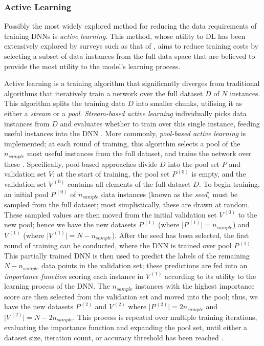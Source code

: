 \documentclass[a4paper, 11pt]{report}
\begin{document}
    \subsubsection{Active Learning}
    \label{section: active-learning}

    Possibly the most widely explored method for reducing the data requirements of training DNNs is \emph{active learning}. This method, whose utility to DL has been extensively explored by surveys such as that of \citet{ren-2021}, aims to reduce training costs by selecting a subset of data instances from the full data space that are believed to provide the most utility to the model's learning process. 

    Active learning is a training algorithm that significantly diverges from traditional algorithms that iteratively train a network over the full dataset $D$ of $N$ instances. This algorithm splits the training data $D$ into smaller chunks, utilising it as either a \emph{stream} or a \emph{pool}. \emph{Stream-based active learning} individually picks data instances from $D$ and evaluates whether to train over this single instance, feeding useful instances into the DNN \citep{ren-2021}. More commonly, \emph{pool-based active learning} is implemented; at each round of training, this algorithm selects a pool of the $n_{sample}$ most useful instances from the full dataset, and trains the network over these \citep{ren-2021}. Specifically, pool-based approaches divide $D$ into the pool set $P$ and validation set $V$; at the start of training, the pool set $P^{\,(0)}$ is empty, and the validation set $V^{\,(0)}$ contains all elements of the full dataset $D$. To begin training, an initial pool $P^{\,(0)}$ of $n_{sample}$ data instances (known as the \emph{seed}) must be sampled from the full dataset; most simplistically, these are drawn at random. These sampled values are then moved from the initial validation set $V^{\,(0)}$ to the new pool; hence we have the new datasets $P^{\,(1)}$ (where $\big\vert P^{\,(1)} \big\vert = n_{sample}$) and $V^{\,(1)}$ (where $\big\vert V^{\,(1)} \big\vert = N - n_{sample}$). After the seed has been selected, the first round of training can be conducted, where the DNN is trained over pool $P^{\,(1)}$. This partially trained DNN is then used to predict the labels of the remaining $N - n_{sample}$ data points in the validation set; these predictions are fed into an \emph{importance function} scoring each instance in $V^{\,(1)}$ according to its utility to the learning process of the DNN. The $n_{sample}$ instances with the highest importance score are then selected from the validation set and moved into the pool; thus, we have the new datasets $P^{\,(2)}$ and $V^{\,(2)}$ where $\big\vert P^{\,(2)} \big\vert = 2 n_{sample}$ and $\big\vert V^{\,(2)} \big\vert = N - 2 n_{sample}$. This process is repeated over multiple training iterations, evaluating the importance function and expanding the pool set, until either a dataset size, iteration count, or accuracy threshold has been reached \citep{ren-2021}.
\end{document}
